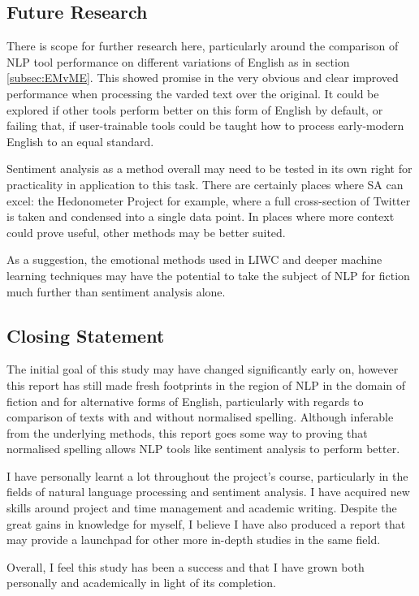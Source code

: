 \documentclass{article}
\begin{document}
{    \subsection{Future Research}
        There is scope for further research here, particularly around the comparison of NLP tool performance on different variations of English as in section \ref{subsec:EMvME}. This showed promise in the very obvious and clear improved performance when processing the varded text over the original. It could be explored if other tools perform better on this form of English by default, or failing that, if user-trainable tools could be taught how to process early-modern English to an equal standard.

        Sentiment analysis as a method overall may need to be tested in its own right for practicality in application to this task. There are certainly places where SA can excel: the Hedonometer Project for example, where a full cross-section of Twitter is taken and condensed into a single data point. In places where more context could prove useful, other methods may be better suited. 
        
        As a suggestion, the emotional methods used in LIWC and deeper machine learning techniques may have the potential to take the subject of NLP for fiction much further than sentiment analysis alone.
    \subsection{Closing Statement}
        The initial goal of this study may have changed significantly early on, however this report has still made fresh footprints in the region of NLP in the domain of fiction and for alternative forms of English, particularly with regards to comparison of texts with and without normalised spelling. Although inferable from the underlying methods, this report goes some way to proving that normalised spelling allows NLP tools like sentiment analysis to perform better.

        I have personally learnt a lot throughout the project's course, particularly in the fields of natural language processing and sentiment analysis. I have acquired new skills around project and time management and academic writing. Despite the great gains in knowledge for myself, I believe I have also produced a report that may provide a launchpad for other more in-depth studies in the same field.
        
        Overall, I feel this study has been a success and that I have grown both personally and academically in light of its completion.
\label{sec:conclusion}
\newpage

\newpage
}
\end{document}
